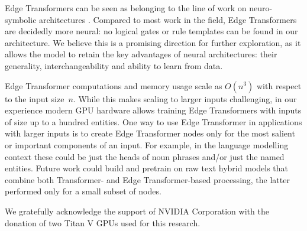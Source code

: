 \documentclass{article}
\begin{document}
Edge Transformers can be seen as belonging to the line of work on
neuro-symbolic architectures \citep[][to name but a
few]{mao_neuro-symbolic_2018,rocktaschel_end--end_2017,evans_learning_2018}.
Compared to most work in the field, Edge Transformers are decidedly
more neural: no logical gates or rule templates can be found in our
architecture. We believe this is a promising direction for further
exploration, as it allows the model to retain the key advantages of
neural architectures: their generality, interchangeability and ability
to learn from data.

Edge Transformer computations and memory usage scale as $O(n^3)$ with
respect to the input size~$n$. While this makes scaling to larger
inputs challenging, in our experience modern GPU hardware allows
training Edge Transformers with inputs of size up to a hundred
entities. One way to use Edge Transformer in applications with larger
inputs is to create Edge Transformer nodes only for the most salient
or important components of an input. For example, in the language
modelling context these could be just the heads of noun phrases and/or
just the named entities. Future work could build and pretrain on raw
text hybrid models that combine both Transformer- and Edge
Transformer-based processing, the latter performed only for a small
subset of nodes.

\newpage

\begin{ack}
  We gratefully acknowledge the support of NVIDIA Corporation with the donation of two Titan V GPUs used for this research. 


\end{ack}





\newpage

\appendix

\end{document}
